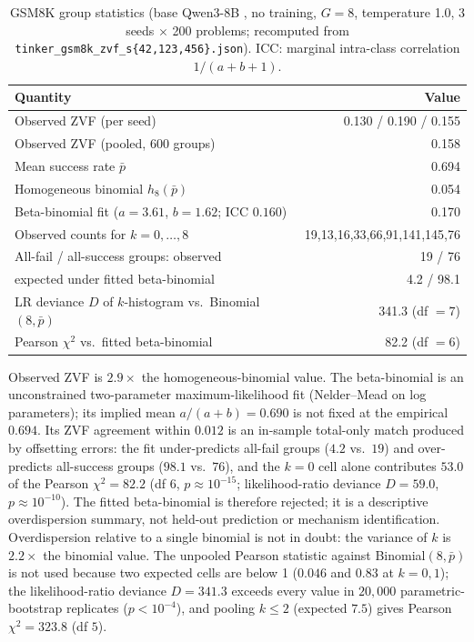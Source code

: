 \documentclass[11pt]{article}
\begin{document}
\begin{table}[t]
\centering
\caption{GSM8K \citep{cobbe2021gsm8k} group statistics (base Qwen3-8B
\citep{yang2025qwen3}, no training, $G{=}8$, temperature 1.0, 3 seeds $\times$
200 problems; recomputed from
\texttt{tinker\_gsm8k\_zvf\_s\{42,123,456\}.json}). ICC: marginal intra-class
correlation $1/(a+b+1)$.}
\label{tab:main}
\small
\begin{tabular}{@{}lr@{}}
\toprule
Quantity & Value \\
\midrule
Observed ZVF (per seed) & 0.130 / 0.190 / 0.155 \\
Observed ZVF (pooled, 600 groups) & 0.158 \\
Mean success rate $\bar p$ & 0.694 \\
Homogeneous binomial $h_8(\bar p)$ & 0.054 \\
Beta-binomial fit ($a{=}3.61$, $b{=}1.62$; ICC $0.160$) & 0.170 \\
Observed counts for $k=0,\ldots,8$ & 19,13,16,33,66,91,141,145,76 \\
All-fail / all-success groups: observed & 19 / 76 \\
\quad expected under fitted beta-binomial & 4.2 / 98.1 \\
LR deviance $D$ of $k$-histogram vs.\ Binomial$(8,\bar p)$ & 341.3 (df $=7$) \\
Pearson $\chi^2$ vs.\ fitted beta-binomial & 82.2 (df $=6$) \\
\bottomrule
\end{tabular}
\end{table}

Observed ZVF is $2.9\times$ the homogeneous-binomial value.
The beta-binomial is an unconstrained two-parameter maximum-likelihood fit
(Nelder--Mead on log parameters); its implied mean $a/(a+b)=0.690$ is not
fixed at the empirical $0.694$. Its ZVF agreement within $0.012$ is an
in-sample total-only match produced by offsetting errors: the fit
under-predicts all-fail groups ($4.2$ vs.\ $19$) and over-predicts all-success
groups ($98.1$ vs.\ $76$), and the $k=0$ cell alone contributes $53.0$ of the
Pearson $\chi^2=82.2$ (df $6$, $p\approx10^{-15}$; likelihood-ratio
deviance $D=59.0$, $p\approx10^{-10}$). The fitted beta-binomial is therefore rejected;
it is a descriptive overdispersion summary, not held-out prediction or mechanism
identification. Overdispersion relative to a single binomial is not in doubt:
the variance of $k$ is $2.2\times$ the binomial value. The unpooled Pearson
statistic against Binomial$(8,\bar p)$ is not used because two expected cells
are below 1 ($0.046$ and $0.83$ at $k=0,1$); the likelihood-ratio deviance $D=341.3$
exceeds every value in $20{,}000$ parametric-bootstrap replicates
($p<10^{-4}$), and pooling $k\le2$ (expected $7.5$) gives Pearson
$\chi^2=323.8$ (df $5$).
\end{document}
